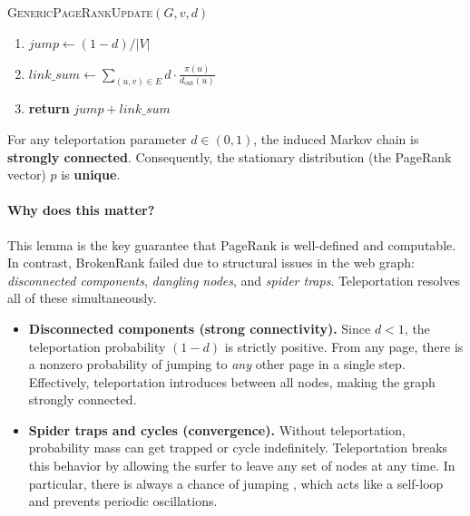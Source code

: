 \documentclass[11pt]{exam}
\begin{document}
\textsc{GenericPageRankUpdate}$(G,v,d)$
\begin{enumerate}
    \item $jump \gets (1-d)/|V|$
    \item $link\_sum \gets \sum_{(u,v)\in E} d \cdot \frac{\pi(u)}{d_{\text{out}}(u)}$
    \item \textbf{return} $jump + link\_sum$
\end{enumerate}

\begin{lemma}
For any teleportation parameter $d \in (0,1)$, the induced Markov chain is \textbf{strongly connected}. Consequently, the stationary distribution (the PageRank vector) $p$ is \textbf{unique}.
\end{lemma}

\vspace{0.5em}

\paragraph{Why does this matter?}
This lemma is the key guarantee that PageRank is well-defined and computable.  
In contrast, BrokenRank failed due to structural issues in the web graph: \emph{disconnected components}, \emph{dangling nodes}, and \emph{spider traps}. Teleportation resolves all of these simultaneously.

\vspace{0.5em}

\begin{itemize}
    \item \textbf{Disconnected components (strong connectivity).}  
    Since $d < 1$, the teleportation probability $(1-d)$ is strictly positive.  
    From any page, there is a nonzero probability of jumping to \emph{any} other page in a single step.  
    Effectively, teleportation introduces  between all nodes, making the graph strongly connected.

    \item \textbf{Spider traps and cycles (convergence).}  
    Without teleportation, probability mass can get trapped or cycle indefinitely.  
    Teleportation breaks this behavior by allowing the surfer to leave any set of nodes at any time.  
    In particular, there is always a chance of jumping , which acts like a self-loop and prevents periodic oscillations.
\end{itemize}

\newpage
\end{document}
